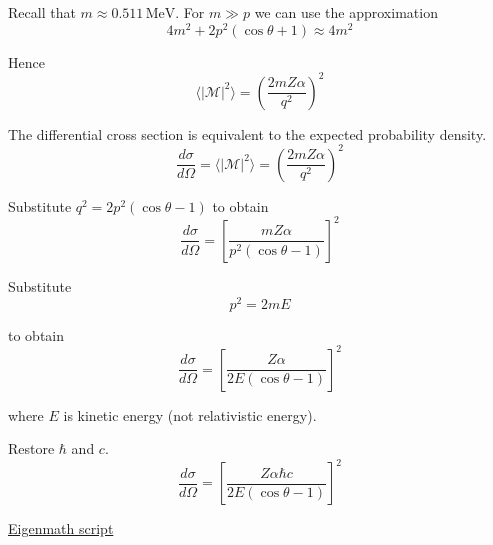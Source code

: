 Recall that $m\approx0.511\,\text{MeV}$.
For $m\gg p$ we can use the approximation
\begin{equation*}
4m^2+2p^2(\cos\theta+1)\approx4m^2
\end{equation*}

Hence
\begin{equation*}
\langle|\mathcal{M}|^2\rangle=\left(\frac{2mZ\alpha}{q^2}\right)^2
\end{equation*}

The differential cross section is equivalent to the expected probability density.
\begin{equation*}
\frac{d\sigma}{d\Omega}=\langle|\mathcal{M}|^2\rangle=\left(\frac{2mZ\alpha}{q^2}\right)^2
\end{equation*}

Substitute $q^2=2p^2(\cos\theta-1)$ to obtain
\begin{equation*}
\frac{d\sigma}{d\Omega}=\left[\frac{mZ\alpha}{p^2(\cos\theta-1)}\right]^2
\end{equation*}

Substitute
\begin{equation*}
p^2=2mE
\end{equation*}

to obtain
\begin{equation*}
\frac{d\sigma}{d\Omega}=\left[\frac{Z\alpha}{2E(\cos\theta-1)}\right]^2
\end{equation*}

where $E$ is kinetic energy (not relativistic energy).

\bigskip
Restore $\hbar$ and $c$.
\begin{equation*}
\frac{d\sigma}{d\Omega}=\left[\frac{Z\alpha\hbar c}{2E(\cos\theta-1)}\right]^2
\end{equation*}

\href{https://georgeweigt.github.io/examples/rutherford-scattering-demo.html}{Eigenmath script}


